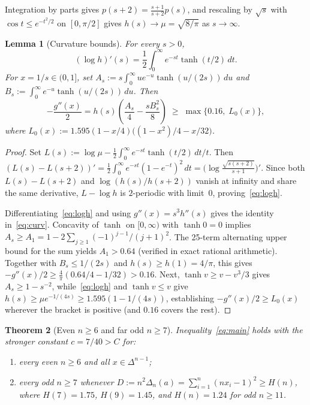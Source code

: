 \documentclass[11pt]{article}
\theoremstyle{plain}
\newtheorem{theorem}{Theorem}
\newtheorem{lemma}[theorem]{Lemma}
\theoremstyle{definition}
\theoremstyle{remark}
\begin{document}
Integration by parts gives $p(s + 2) = \frac{s + 1}{s + 2}p(s)$, and rescaling by $\sqrt{s}$ with $\cos t \le e^{-t^2/2}$ on $[0, \pi/2]$ gives $h(s) \to \mu = \sqrt{8/\pi}$ as $s \to \infty$.

\begin{lemma}[Curvature bounds]\label{lem:curv}
For every $s > 0$,
\begin{equation}\label{eq:logh}
(\log h)'(s) = \frac{1}{2}\int_0^\infty e^{-st}\tanh(t/2)\,dt.
\end{equation}
For $x = 1/s \in (0, 1]$, set $A_s := s\int_0^\infty u e^{-u}\tanh(u/(2s))\,du$ and $B_s := \int_0^\infty e^{-u}\tanh(u/(2s))\,du$. Then
\begin{equation}\label{eq:curv}
-\frac{g''(x)}{2} = h(s)\left(\frac{A_s}{4} - \frac{s B_s^2}{8}\right)
\;\ge\; \max\bigl\{0.16,\; L_0(x)\bigr\},
\end{equation}
where $L_0(x) := 1.595(1 - x/4)\bigl((1 - x^2)/4 - x/32\bigr)$.
\end{lemma}

\begin{proof}
Set $L(s) := \log\mu - \frac{1}{2}\int_0^\infty e^{-st}\tanh(t/2)\,dt/t$.
Then $(L(s) - L(s+2))' = \frac{1}{2}\int_0^\infty e^{-st}(1 - e^{-t})^2\,dt = \bigl(\log\frac{\sqrt{s(s+2)}}{s+1}\bigr)'$.
Since both $L(s) - L(s+2)$ and $\log(h(s)/h(s+2))$ vanish at infinity and share the same derivative, $L - \log h$ is $2$-periodic with limit~$0$, proving~\eqref{eq:logh}.

Differentiating~\eqref{eq:logh} and using $g''(x) = s^3 h''(s)$ gives the identity in~\eqref{eq:curv}.
Concavity of $\tanh$ on $[0, \infty)$ with $\tanh 0 = 0$ implies $A_s \ge A_1 = 1 - 2\sum_{j \ge 1}(-1)^{j-1}/(j+1)^2$.
The 25-term alternating upper bound for the sum yields $A_1 > 0.64$ (verified in exact rational arithmetic).
Together with $B_s \le 1/(2s)$ and $h(s) \ge h(1) = 4/\pi$, this gives $-g''(x)/2 \ge \frac{4}{\pi}(0.64/4 - 1/32) > 0.16$.
Next, $\tanh v \ge v - v^3/3$ gives $A_s \ge 1 - s^{-2}$, while~\eqref{eq:logh} and $\tanh v \le v$ give $h(s) \ge \mu e^{-1/(4s)} \ge 1.595(1 - 1/(4s))$, establishing $-g''(x)/2 \ge L_0(x)$ wherever the bracket is positive (and $0.16$ covers the rest).
\end{proof}

\begin{theorem}[Even $n \ge 6$ and far odd $n \ge 7$]\label{thm:far}
Inequality~\eqref{eq:main} holds with the stronger constant $c = 7/40 > C$ for:
\begin{enumerate}[label=\textup{(\arabic*)}]
\item every even $n \ge 6$ and all $x \in \Delta^{n-1}$;
\item every odd $n \ge 7$ whenever $D := n^2\Delta_n(a) = \sum_{i=1}^n (n x_i - 1)^2 \ge H(n)$, where $H(7) = 1.75$, $H(9) = 1.45$, and $H(n) = 1.24$ for odd $n \ge 11$.
\end{enumerate}
\end{theorem}
\end{document}

